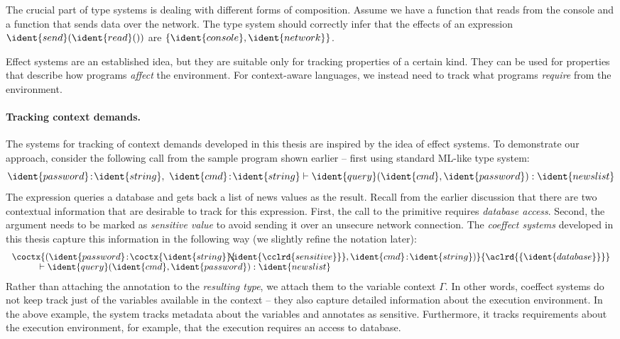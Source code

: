 The crucial part of type systems is dealing with different forms of composition. Assume
we have a function  that reads from the console and a function  that sends
data over the network. The type system should correctly infer that the effects of an
expression $\ident{send}(\ident{read}())$ are $\{ \ident{console}, \ident{network} \}$.

Effect systems are an established idea, but they are suitable only for tracking properties of a
certain kind. They can be used for properties that describe how programs \emph{affect} the environment.
For context-aware languages, we instead need to track what programs \emph{require} from the environment.

\paragraph{Tracking context demands.}

The systems for tracking of context demands developed in this thesis are inspired by the idea
of effect systems. To demonstrate our approach, consider the following call from the sample program
shown earlier -- first using standard ML-like type system:
%
\begin{equation*}
\ident{password}\!:\!\ident{string},~\ident{cmd}\!:\!\ident{string}
  \vdash \ident{query}(\ident{cmd}, \ident{password}) : \ident{news list}
\end{equation*}
%
The expression queries a database and gets back a list of news values as the result. Recall from the
earlier discussion that there are two contextual information that are desirable to track for this
expression. First, the call to the  primitive requires \emph{database access}. Second,
the  argument needs to be marked as \emph{sensitive value} to avoid sending it over
an unsecure network connection. The \emph{coeffect systems} developed in this thesis capture this
information in the following way (we slightly refine the notation later):
%
\begin{equation*}
\begin{array}{l}
 \coctx{( \ident{password}\!:\!\coctx{\ident{string}}{\hspace{-0.75em}\ident{\cclrd{\footnotesize sensitive}}},
   \ident{cmd}\!:\!\ident{string})}{ \aclrd{\{ \ident{database} \}}}  \\[-0.1em]
 \hspace{3em} \vdash\ident{query}(\ident{cmd}, \ident{password}) : \ident{news list}
\end{array}
\end{equation*}
%
Rather than attaching the annotation to the \emph{resulting type}, we attach them to the variable
context $\Gamma$. In other words, coeffect systems do not keep track just of the variables available
in the context -- they also capture detailed information about the execution environment.
In the above example, the system tracks metadata about the variables and annotates 
as sensitive. Furthermore, it tracks requirements about the execution environment, for example,
that the execution requires an access to database.

